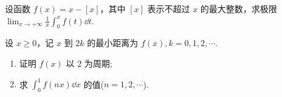 	\begin{ti}
		设函数 $f(x) = x - [x]$，其中 $[x]$ 表示不超过 $x$ 的最大整数，求极限 $\lim_{x \to +\infty} \frac{1}{x} \int_{0}^{x} f(t) \dd{t}$.
	\end{ti}

	\begin{ti}
		设 $x \geq 0$，记 $x$ 到 $2k$ 的最小距离为 $f(x), k = 0,1,2,\cdots$.
		\begin{enumerate}
			\item 证明 $f(x)$ 以 $2$ 为周期;
			\item 求 $\int_{0}^{1} f(nx) \dd{x}$ 的值($n = 1,2,\cdots$).
		\end{enumerate}
	\end{ti}